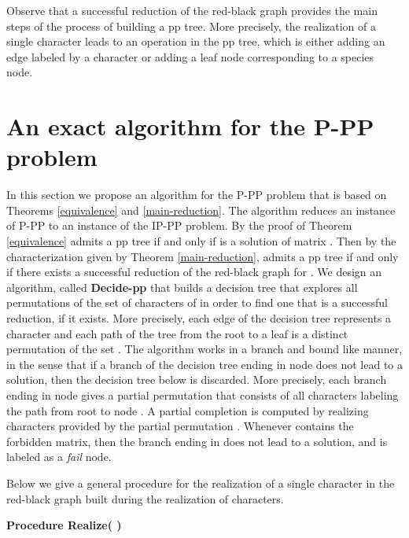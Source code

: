 \documentclass{llncs}
\newcommand{\pp}{Decide-pp}
\newcommand{\grb}{ }
\begin{document}
Observe  that a successful reduction of the red-black graph provides the main steps of the process of building  a pp tree. More precisely,  the realization of a single character leads to an operation in the pp tree, which is either adding an edge labeled by a character or adding a leaf node corresponding to a species node.











\section{An exact algorithm for the P-PP problem}
In this section we propose an algorithm for   the P-PP problem that is based on Theorems \ref{equivalence} and \ref{main-reduction}.
The algorithm   reduces an instance  of P-PP to an instance  of the  IP-PP problem.  By the proof of Theorem \ref{equivalence}   admits a pp tree  if and only if  is a solution of  matrix . 
Then by the characterization given by Theorem \ref{main-reduction},   admits a pp tree  if and only if there exists a successful reduction of the red-black graph for .   We design an algorithm, called {\bf  \pp}  that  builds a  decision tree that explores all permutations of  the set  of  characters  of  in order to find one that is a successful reduction, if it exists.  More precisely, each edge of the decision tree  represents a character and each path of the tree from the root to a leaf is a distinct permutation of the set .  
The algorithm works in a branch and bound like manner, in the sense that if a branch of the decision tree ending in node  does not lead to a solution, then the decision tree below  is discarded.  More precisely,  each branch ending in node    gives a partial permutation    that consists of all characters labeling the path from root  to  node . A partial completion   is computed by realizing characters provided by the partial permutation . Whenever  contains the forbidden matrix,  then the branch ending in  does  not lead to a solution, and  is labeled as a {\em fail} node.



\vspace{.2in}

Below we give a general procedure for the realization of a single character in the red-black graph built during the realization of characters.


{\bf Procedure Realize(\grb )}
\end{document}

